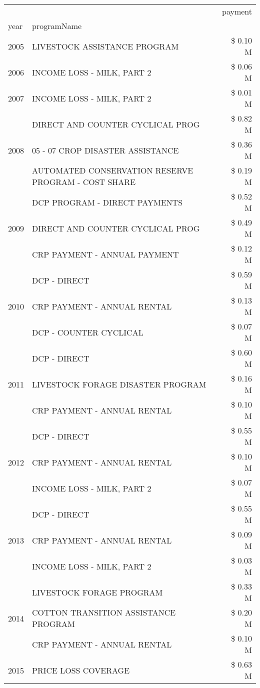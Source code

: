 \begin{tabular}{llr}
\toprule
 &  & payment \\
year & programName &  \\
\midrule
2005 & LIVESTOCK ASSISTANCE PROGRAM & \$ 0.10 M \\
\cline{1-3}
2006 & INCOME LOSS - MILK, PART 2 & \$ 0.06 M \\
\cline{1-3}
2007 & INCOME LOSS - MILK, PART 2 & \$ 0.01 M \\
\cline{1-3}
\multirow[t]{3}{*}{2008} & DIRECT AND COUNTER CYCLICAL PROG & \$ 0.82 M \\
 & 05 - 07 CROP DISASTER ASSISTANCE & \$ 0.36 M \\
 & AUTOMATED CONSERVATION RESERVE PROGRAM - COST SHARE & \$ 0.19 M \\
\cline{1-3}
\multirow[t]{3}{*}{2009} & DCP PROGRAM - DIRECT PAYMENTS & \$ 0.52 M \\
 & DIRECT AND COUNTER CYCLICAL PROG & \$ 0.49 M \\
 & CRP PAYMENT - ANNUAL PAYMENT & \$ 0.12 M \\
\cline{1-3}
\multirow[t]{3}{*}{2010} & DCP - DIRECT & \$ 0.59 M \\
 & CRP PAYMENT - ANNUAL RENTAL & \$ 0.13 M \\
 & DCP - COUNTER CYCLICAL & \$ 0.07 M \\
\cline{1-3}
\multirow[t]{3}{*}{2011} & DCP - DIRECT & \$ 0.60 M \\
 & LIVESTOCK FORAGE DISASTER PROGRAM & \$ 0.16 M \\
 & CRP PAYMENT - ANNUAL RENTAL & \$ 0.10 M \\
\cline{1-3}
\multirow[t]{3}{*}{2012} & DCP - DIRECT & \$ 0.55 M \\
 & CRP PAYMENT - ANNUAL RENTAL & \$ 0.10 M \\
 & INCOME LOSS - MILK, PART 2 & \$ 0.07 M \\
\cline{1-3}
\multirow[t]{3}{*}{2013} & DCP - DIRECT & \$ 0.55 M \\
 & CRP PAYMENT - ANNUAL RENTAL & \$ 0.09 M \\
 & INCOME LOSS - MILK, PART 2 & \$ 0.03 M \\
\cline{1-3}
\multirow[t]{3}{*}{2014} & LIVESTOCK FORAGE PROGRAM & \$ 0.33 M \\
 & COTTON TRANSITION ASSISTANCE PROGRAM & \$ 0.20 M \\
 & CRP PAYMENT - ANNUAL RENTAL & \$ 0.10 M \\
\cline{1-3}
\multirow[t]{3}{*}{2015} & PRICE LOSS COVERAGE & \$ 0.63 M \\

\end{tabular}

